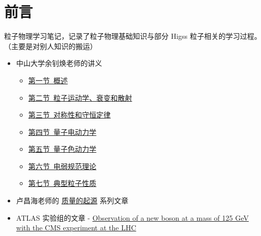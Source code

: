 \chapter{前言}

粒子物理学习笔记，记录了粒子物理基础知识与部分 Higss 粒子相关的学习过程。（主要是对别人知识的搬运）

\begin{itemize}
    \item 中山大学余钊焕老师的讲义
        \begin{itemize}
            \item \href{https://yzhxxzxy.github.io/teaching/2109_PartPhys_sec1_intro.pdf}{第一节\ 概述}
            \item \href{https://yzhxxzxy.github.io/teaching/2109_PartPhys_sec2_kin.pdf}{第二节\ 粒⼦运动学、衰变和散射}
            \item \href{https://yzhxxzxy.github.io/teaching/2109_PartPhys_sec3_sym.pdf}{第三节\ 对称性和守恒定律}
            \item \href{https://yzhxxzxy.github.io/teaching/2109_PartPhys_sec4_QED.pdf}{第四节\ 量子电动力学}
            \item \href{https://yzhxxzxy.github.io/teaching/2109_PartPhys_sec5_QCD.pdf}{第五节\ 量子色动力学}
            \item \href{https://yzhxxzxy.github.io/teaching/2109_PartPhys_sec6_EW.pdf}{第六节\ 电弱规范理论}
            \item \href{https://yzhxxzxy.github.io/teaching/2109_PartPhys_sec7_part.pdf}{第七节\ 典型粒子性质}
        \end{itemize}
    \item 卢昌海老师的 \href{https://www.changhai.org/articles/science/physics/origin_of_mass/}{质量的起源} 系列文章
    \item ATLAS 实验组的文章 - \href{https://inspirehep.net/literature/1124338}{Observation of a new boson at a mass of 125 GeV with the CMS experiment at the LHC}
\end{itemize}
